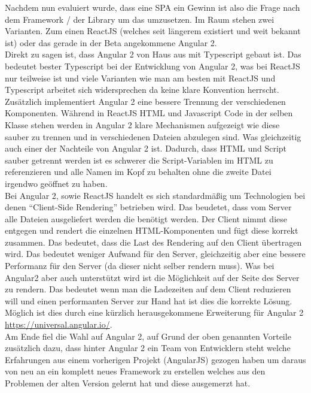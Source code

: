 Nachdem nun evaluiert wurde, dass eine SPA ein Gewinn ist also die Frage nach dem Framework / der Library um das umzusetzen. Im Raum stehen zwei Varianten. Zum einen ReactJS (welches seit längerem existiert und weit bekannt ist) oder das gerade in der Beta angekommene Angular 2. \\
Direkt zu sagen ist, dass Angular 2 von Haus aus mit Typescript gebaut ist. Das bedeutet bester Typescript bei der Entwicklung von Angular 2, was bei ReactJS nur teilweise ist und viele Varianten wie man am besten mit ReactJS und Typescript arbeitet sich widersprechen da keine klare Konvention herrscht. \\
Zusätzlich implementiert Angular 2 eine bessere Trennung der verschiedenen Komponenten. Während in ReactJS HTML und Javascript Code in der selben Klasse stehen werden in Angular 2 klare Mechanismen aufgezeigt wie diese sauber zu trennen und in verschiedenen Dateien abzulegen sind. Was gleichzeitig auch einer der Nachteile von Angular 2 ist. Dadurch, dass HTML und Script sauber getrennt werden ist es schwerer die Script-Variablen im HTML zu referenzieren und alle Namen im Kopf zu behalten ohne die zweite Datei irgendwo geöffnet zu haben. \\
Bei Angular 2, sowie ReactJS handelt es sich standardmäßig um Technologien bei denen ``Client-Side Rendering'' betrieben wird. Das beudetet, dass vom Server alle Dateien ausgeliefert werden die benötigt werden. Der Client nimmt diese entgegen und rendert die einzelnen HTML-Komponenten und fügt diese korrekt zusammen. Das bedeutet, dass die Last des Rendering auf den Client übertragen wird. Das bedeutet weniger Aufwand für den Server, gleichzeitig aber eine bessere Performanz für den Server (da dieser nicht selber rendern muss). Was bei Angular2 aber auch unterstützt wird ist die Möglichkeit auf der Seite des Server zu rendern. Das bedeutet wenn man  die Ladezeiten auf dem Client reduzieren will und einen performanten Server zur Hand hat ist dies die korrekte Lösung. Möglich ist dies durch eine kürzlich herausgekommene Erweiterung für Angular 2 \url{https://universal.angular.io/}. \\

Am Ende fiel die Wahl auf Angular 2, auf Grund der oben genannten Vorteile zusätzlich dazu, dass hinter Angular 2 ein Team von Entwicklern steht welche Erfahrungen aus einem vorherigen Projekt (AngularJS) gezogen haben um daraus von neu an ein komplett neues Framework zu erstellen welches aus den Problemen der alten Version gelernt hat und diese ausgemerzt hat.

